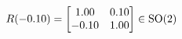 \documentclass[preview]{standalone}
\begin{document}
\begin{align*}
\special{dvisvgm:raw <g id='unique000'>}R(-0.10) = \begin{bmatrix} 1.00 & 0.10 \\ -0.10 & 1.00 \end{bmatrix} \in \text{SO}(2)\special{dvisvgm:raw </g>}
\end{align*}
\end{document}
